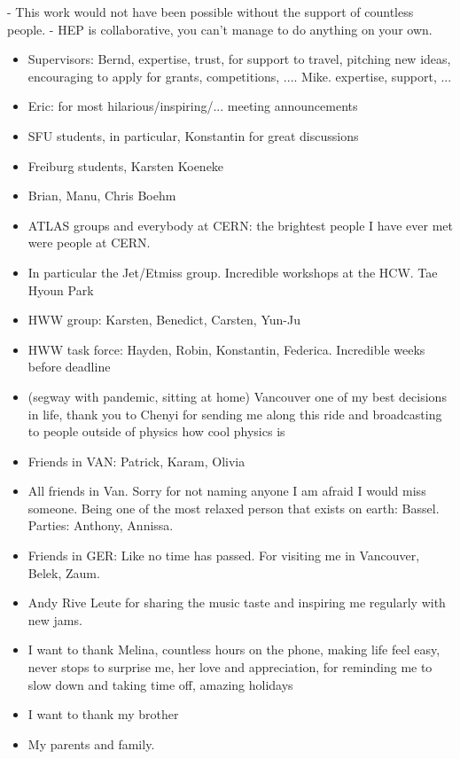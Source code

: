 

- This work would not have been possible without the support of countless people.
- HEP is collaborative, you can't manage to do anything on your own.

\begin{itemize}
    \item Supervisors: Bernd, expertise, trust, for support to travel, pitching new ideas, encouraging to apply for grants, competitions, .... Mike. expertise, support, ...
    \item Eric: for most hilarious/inspiring/... meeting announcements
    \item SFU students, in particular, Konstantin for great discussions
    \item Freiburg students, Karsten Koeneke
    \item Brian, Manu, Chris Boehm
    \item ATLAS groups and everybody at CERN: the brightest people I have ever met were people at CERN.
    \item In particular the Jet/Etmiss group. Incredible workshops at the HCW. Tae Hyoun Park
    \item HWW group: Karsten, Benedict, Carsten, Yun-Ju
    \item HWW task force: Hayden, Robin, Konstantin, Federica. Incredible weeks before deadline
    \item (segway with pandemic, sitting at home) Vancouver one of my best decisions in life, thank you to Chenyi for sending me along this ride and broadcasting to people outside of physics how cool physics is
    \item Friends in VAN: Patrick, Karam, Olivia
    \item All friends in Van. Sorry for not naming anyone I am afraid I would miss someone. Being one of the most relaxed person that exists on earth: Bassel. Parties: Anthony, Annissa.
    \item Friends in GER: Like no time has passed. For visiting me in Vancouver, Belek, Zaum. 
    \item Andy Rive Leute for sharing the music taste and inspiring me regularly with new jams. 
    \item I want to thank Melina, countless hours on the phone, making life feel easy, never stops to surprise me, her love and appreciation, for reminding me to slow down and taking time off, amazing holidays
    \item I want to thank my brother
    \item My parents and family. 
\end{itemize}

